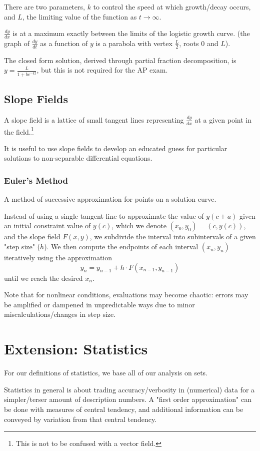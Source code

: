 \documentclass{article}
\begin{document}
There are two parameters, $k$ to control the speed at which growth/decay occurs, and $L$, the limiting value of the function as $t\to\infty$.

$\frac{dy}{dx}$ is at a maximum exactly between the limits of the logistic growth curve. (the graph of $\frac{dy}{dt}$ as a function of $y$ is a parabola with vertex $\frac{L}{2}$, roots $0$ and $L$).

The closed form solution, derived through partial fraction decomposition, is $y=\frac{L}{1+be^{-kt}}$, but this is not required for the AP exam.

\subsection{Slope Fields}
A slope field is a lattice of small tangent lines representing $\frac{dy}{dx}$ at a given point in the field.\footnote{This is not to be confused with a vector field.}

It is useful to use slope fields to develop an educated guess for particular solutions to non-separable differential equations.

\subsubsection{Euler's Method}
A method of successive approximation for points on a solution curve.

Instead of using a single tangent line to approximate the value of $y(c+a)$ given an initial constraint value of $y(c)$, which we denote $(x_0,y_0)=(c,y(c))$, and the slope field $F(x,y)$, we subdivide the interval into subintervals of a given "step size" ($h$).  We then compute the endpoints of each interval $(x_n,y_n)$ iteratively using the approximation $$y_n=y_{n-1}+h\cdot F\left(x_{n-1},y_{n-1}\right)$$ until we reach the desired $x_n$.

Note that for nonlinear conditions, evaluations may become chaotic: errors may be amplified or dampened in unpredictable ways due to minor miscalculations/changes in step size.

\section{Extension: Statistics}
For our definitions of statistics, we base all of our analysis on sets.

Statistics in general is about trading accuracy/verbosity in (numerical) data for a simpler/terser amount of description numbers. A "first order approximation" can be done with measures of central tendency, and additional information can be conveyed by variation from that central tendency.
\end{document}

